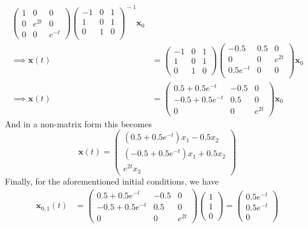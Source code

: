 \documentclass[12pt]{article}
\begin{document}
\begin{enumerate}
\begin{align*}
                \begin{pmatrix} 1 & 0 & 0\\ 0 & e^{2t} & 0\\ 0 & 0 & e^{-t} \end{pmatrix}
                \begin{pmatrix} -1 & 0 & 1\\ 1 & 0 & 1\\ 0 & 1 & 0\\ \end{pmatrix}^{\!-1}\mathbf{x}_{0}\\
\implies \mathbf{x}(t) &= \begin{pmatrix} -1 & 0 & 1\\ 1 & 0 & 1\\ 0 & 1 & 0 \end{pmatrix} \begin{pmatrix} -0.5 & 0.5 & 0\\ 0 & 0 & e^{2t}\\ 0.5e^{-t} & 0 & 0\\ \end{pmatrix}\mathbf{x}_{0}\\
\implies \mathbf{x}(t) &= \begin{pmatrix} 0.5+0.5e^{-t} & -0.5 & 0\\ -0.5+0.5e^{-t} & 0.5 & 0\\ 0 & 0 & e^{2t}\end{pmatrix}\mathbf{x}_{0}
\end{align*}
And in a non-matrix form this becomes 
\[
\mathbf{x}(t)=\begin{pmatrix} (0.5 + 0.5e^{-t})x_{1} - 0.5x_{2}\\ (-0.5 + 0.5e^{-t})x_{1} + 0.5x_{2}\\ e^{2t}x_{3}\end{pmatrix}
\]
Finally, for the aforementioned initial conditions, we have
\begin{align*}
\mathbf{x}_{0,1}(t)&=\begin{pmatrix} 0.5+0.5e^{-t} & -0.5 & 0\\ -0.5+0.5e^{-t} & 0.5 & 0\\ 0 & 0 & e^{2t}\end{pmatrix} \begin{pmatrix} 1\\ 1\\ 0 \end{pmatrix} = \begin{pmatrix} 0.5e^{-t}\\ 0.5e^{-t}\\ 0 \end{pmatrix}\\

\end{align*}
\end{enumerate}
\end{document}
